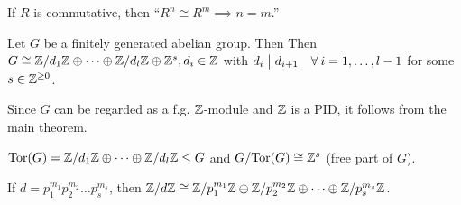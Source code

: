 \begin{remark}
  If $R$ is commutative, then ``$R^n \cong R^m \implies n = m$.''
\end{remark}

\begin{theorem}
  Let $G$ be a finitely generated abelian group. Then
  Then $G \cong {\mathbb{Z}}/{d_1 \mathbb{Z}} \oplus \dots \oplus {\mathbb{Z}}/{d_l \mathbb{Z}}
  \oplus \mathbb{Z}^s, d_i \in \mathbb{Z}$ with $d_i \Div d_{i+1} \quad
  \forall i = 1, \dots, l-1$ for some $s \in \mathbb{Z}^{\ge 0}$.

  Since $G$ can be regarded as a f.g. $\mathbb{Z}$-module and $\mathbb{Z}$ is a PID,
  it follows from the main theorem.

  $\operatorname{Tor}(G) = {\mathbb{Z}}/{d_1 \mathbb{Z}} \oplus \dots \oplus {\mathbb{Z}}/{d_l \mathbb{Z}}
  \le G$ and ${G}/{\operatorname{Tor}(G)} \cong \mathbb{Z}^s$ (free part of $G$).
\end{theorem}

\begin{fact}
  If $d = p_1^{m_1}p_2^{m_2}\dots p_s^{m_s}$, then
  ${\mathbb{Z}}/{d\mathbb{Z}} \cong {\mathbb{Z}}/{p_1^{m_1}\mathbb{Z}} \oplus
  {\mathbb{Z}}/{p_2^{m_2}\mathbb{Z}} \oplus \dots \oplus {\mathbb{Z}}/{p_s^{m_s}\mathbb{Z}}$.
\end{fact}

